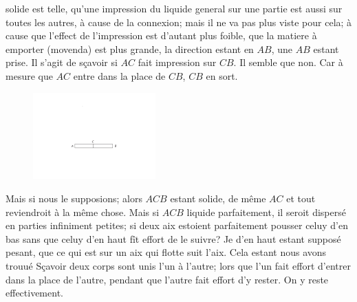 %
{}
solide est telle, qu'une impression du liquide general sur une partie est aussi sur toutes  les autres,
\`{a} cause de la connexion; mais il ne va pas plus viste pour cela;
\`{a} cause que l'effect de l'impression est d'autant plus foible,
que  la matiere \`{a} emporter (movenda) est plus grande, la direction estant en $AB$,
une 
$AB$ estant prise.
Il s'agit  de s\c{c}avoir si $AC$ fait impression sur $CB.$ Il semble que non.
Car \`{a} mesure que $AC$ entre dans la place de $CB$, $CB$ en sort.
\pend
\pstart
\begin{figure} 
\vspace{-4.5mm}\includegraphics[width=0.42\textwidth]{images/LH037,03_86v-d2.pdf}\\
 \noindent {}
\end{figure}
\noindent 
Mais  si nous le supposions; alors $ACB$ estant solide,  de m\^{e}me $AC$ et tout reviendroit \`{a} la m\^{e}me  chose.  Mais si $ACB$ liquide parfaitement, il seroit dispers\'{e} en parties infiniment petites; si deux aix\protect{} estoient parfaitement   pousser celuy d'en bas sans que celuy d'en haut f\^{i}t effort de le suivre? Je  d'en  haut estant suppos\'{e} pesant,  que ce qui est sur un aix\protect{} qui flotte suit l'aix. Cela estant nous avons trouu\'{e}  S\c{c}avoir deux corps sont unis l'un \`{a} l'autre; lors que l'un fait effort d'entrer dans la place de l'autre, pendant que l'autre fait effort d'y rester. On y reste effectivement.
